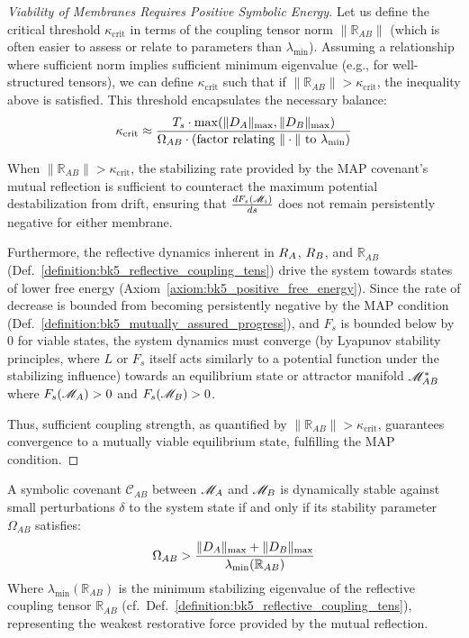 \begin{proof}[Viability of Membranes Requires Positive Symbolic Energy]
Let us define the critical threshold \( \kappa_{\text{crit}} \) in terms of the coupling tensor norm \( \| \mathbb{R}_{AB} \| \) (which is often easier to assess or relate to parameters than \( \lambda_{\min} \)). Assuming a relationship where sufficient norm implies sufficient minimum eigenvalue (e.g., for well-structured tensors), we can define \( \kappa_{\text{crit}} \) such that if \( \| \mathbb{R}_{AB} \| > \kappa_{\text{crit}} \), the inequality above is satisfied. This threshold encapsulates the necessary balance:
\begin{equation}
\kappa_{\text{crit}} \approx \frac{T_s \cdot \max(\| D_A \|_{\max}, \| D_B \|_{\max})}{\Omega_{AB} \cdot (\text{factor relating } \| \cdot \| \text{ to } \lambda_{\min})}
\end{equation}

When \( \| \mathbb{R}_{AB} \| > \kappa_{\text{crit}} \), the stabilizing rate provided by the MAP covenant's mutual reflection is sufficient to counteract the maximum potential destabilization from drift, ensuring that \( \frac{dF_s(\mathscr{M}_i)}{ds} \) does not remain persistently negative for either membrane.

Furthermore, the reflective dynamics inherent in \( R_A \), \( R_B \), and \( \mathbb{R}_{AB} \) (Def.~\ref{definition:bk5_reflective_coupling_tens}) drive the system towards states of lower free energy (Axiom~\ref{axiom:bk5_positive_free_energy}). Since the rate of decrease is bounded from becoming persistently negative by the MAP condition (Def.~\ref{definition:bk5_mutually_assured_progress}), and \( F_s \) is bounded below by 0 for viable states, the system dynamics must converge (by Lyapunov stability principles, where \( L \) or \( F_s \) itself acts similarly to a potential function under the stabilizing influence) towards an equilibrium state or attractor manifold \( \mathscr{M}_{AB}^* \) where \( F_s(\mathscr{M}_A) > 0 \) and \( F_s(\mathscr{M}_B) > 0 \).

Thus, sufficient coupling strength, as quantified by \( \| \mathbb{R}_{AB} \| > \kappa_{\text{crit}} \), guarantees convergence to a mutually viable equilibrium state, fulfilling the MAP condition.
\end{proof}
\begin{theorem} \label{theorem:bk5_covenant_stability_theorem}
A symbolic covenant $\mathcal{C}_{AB}$ between $\mathscr{M}_A$ and $\mathscr{M}_B$ is dynamically stable against small perturbations $\delta$ to the system state if and only if its stability parameter $\Omega_{AB}$ satisfies:
\begin{equation}
\Omega_{AB} > \frac{\|D_A\|_{\max} + \|D_B\|_{\max}}{\lambda_{\min}(\mathbb{R}_{AB})}
\end{equation}
Where $\lambda_{\min}(\mathbb{R}_{AB})$ is the minimum stabilizing eigenvalue of the reflective coupling tensor $\mathbb{R}_{AB}$ (cf.~Def.~\ref{definition:bk5_reflective_coupling_tens}), representing the weakest restorative force provided by the mutual reflection.
\end{theorem}

